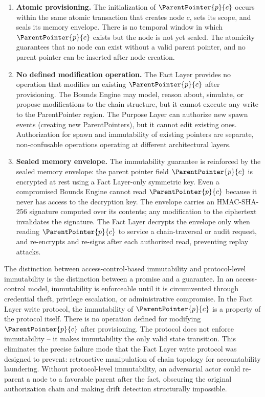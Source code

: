 \begin{enumerate}
    \item \textbf{Atomic provisioning.} The initialization of $\ParentPointer{p}{c}$ occurs within the same atomic transaction that creates node $c$, sets its scope, and seals its memory envelope. There is no temporal window in which $\ParentPointer{p}{c}$ exists but the node is not yet sealed. The atomicity guarantees that no node can exist without a valid parent pointer, and no parent pointer can be inserted after node creation.

    \item \textbf{No defined modification operation.} The Fact Layer provides no operation that modifies an existing $\ParentPointer{p}{c}$ after provisioning. The Bounds Engine may model, reason about, simulate, or propose modifications to the chain structure, but it cannot execute any write to the ParentPointer region. The Purpose Layer can authorize new spawn events (creating new ParentPointers), but it cannot edit existing ones. Authorization for spawn and immutability of existing pointers are separate, non-confusable operations operating at different architectural layers.

    \item \textbf{Sealed memory envelope.} The immutability guarantee is reinforced by the sealed memory envelope: the parent pointer field $\ParentPointer{p}{c}$ is encrypted at rest using a Fact Layer-only symmetric key. Even a compromised Bounds Engine cannot read $\ParentPointer{p}{c}$ because it never has access to the decryption key. The envelope carries an HMAC-SHA-256 signature computed over its contents; any modification to the ciphertext invalidates the signature. The Fact Layer decrypts the envelope only when reading $\ParentPointer{p}{c}$ to service a chain-traversal or audit request, and re-encrypts and re-signs after each authorized read, preventing replay attacks.
\end{enumerate}

The distinction between access-control-based immutability and protocol-level immutability is the distinction between a promise and a guarantee. In an access-control model, immutability is enforceable until it is circumvented through credential theft, privilege escalation, or administrative compromise. In the Fact Layer write protocol, the immutability of $\ParentPointer{p}{c}$ is a property of the protocol itself. There is no operation defined for modifying $\ParentPointer{p}{c}$ after provisioning. The protocol does not enforce immutability -- it makes immutability the only valid state transition. This eliminates the precise failure mode that the Fact Layer write protocol was designed to prevent: retroactive manipulation of chain topology for accountability laundering. Without protocol-level immutability, an adversarial actor could re-parent a node to a favorable parent after the fact, obscuring the original authorization chain and making drift detection structurally impossible.

